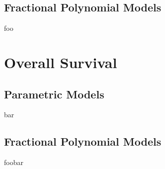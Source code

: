 \subsection{Fractional Polynomial Models}
foo

\section{Overall Survival}

\subsection{Parametric Models}
bar

\subsection{Fractional Polynomial Models}
foobar